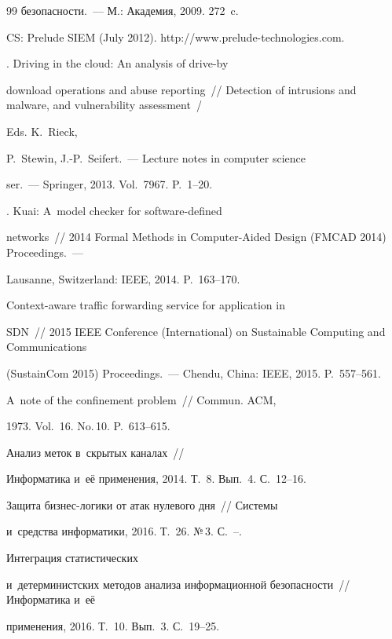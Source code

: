 {{\begin{thebibliography}{99}
без\-опас\-ности.~--- М.: Академия, 2009. 272~c.




     CS: Prelude SIEM (July 2012). {\sf http://www.prelude-technologies.com}.




     . Driving in the cloud: An analysis of drive-by 


download operations and abuse reporting~/\!\!/ Detection of intrusions and malware, and vulnerability assessment~/


Eds. K.~Rieck, 


P.~Stewin, J.-P.~Seifert.~--- Lecture notes in computer science


ser.~--- Springer,  2013. Vol.~7967. P.~1--20.




     . Kuai: A~model checker for software-defined 


networks~/\!\!/ 2014 Formal Methods in Computer-Aided Design (FMCAD 2014) Proceedings.~---


Lausanne, Switzerland: IEEE, 2014. P.~163--170.




      Context-aware traffic forwarding service for application in 


SDN~/\!\!/ 2015 IEEE Conference (International) on Sustainable Computing and Communications 


(SustainCom 2015) Proceedings.~--- Chendu, China: IEEE, 2015. P.~557--561.




      A~note of the confinement problem~/\!\!/ Commun. ACM, 


1973. Vol.~16. No.\,10. P.~613--615.




      Анализ меток в~скрытых каналах~/\!\!/ 


Информатика и~её применения, 2014. Т.~8. Вып.~4. С.~12--16.




      Защита бизнес-логики от атак нулевого дня~/\!\!/ Системы 


и~средства информатики, 2016. Т.~26. №\,3. С.~\pageref{stgrusho}--\pageref{endgrusho}. 




      Интеграция статистических 


и~детерминистских методов анализа информационной безопасности~/\!\!/ Информатика и~её 


применения, 2016. Т.~10. Вып.~3. С.~19--25.


     \end{thebibliography}


} }








